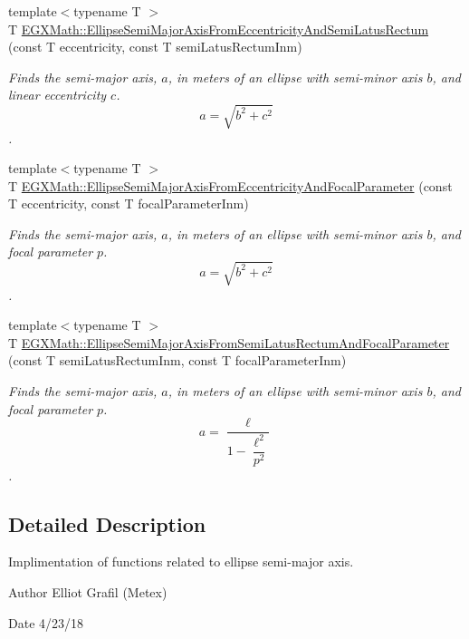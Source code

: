\begin{DoxyCompactItemize}
{\footnotesize template$<$typename T $>$ }\\T \mbox{\hyperlink{group___e_g_x_math-_geometry-2_d-_ellipse-_semi_major_axis_ga00e19efce15b74c6556cbd5650d7f699}{E\+G\+X\+Math\+::\+Ellipse\+Semi\+Major\+Axis\+From\+Eccentricity\+And\+Semi\+Latus\+Rectum}} (const T eccentricity, const T semi\+Latus\+Rectum\+Inm)
\begin{DoxyCompactList}\small\item\em Finds the semi-\/major axis, $a$, in meters of an ellipse with semi-\/minor axis $b$, and linear eccentricity $c$. \[ a=\sqrt{b^2+c^2} \]. \end{DoxyCompactList}\item 
{\footnotesize template$<$typename T $>$ }\\T \mbox{\hyperlink{group___e_g_x_math-_geometry-2_d-_ellipse-_semi_major_axis_ga77845ca288672da90567f533679e7024}{E\+G\+X\+Math\+::\+Ellipse\+Semi\+Major\+Axis\+From\+Eccentricity\+And\+Focal\+Parameter}} (const T eccentricity, const T focal\+Parameter\+Inm)
\begin{DoxyCompactList}\small\item\em Finds the semi-\/major axis, $a$, in meters of an ellipse with semi-\/minor axis $b$, and focal parameter $p$. \[ a=\sqrt{b^2+c^2} \]. \end{DoxyCompactList}\item 
{\footnotesize template$<$typename T $>$ }\\T \mbox{\hyperlink{group___e_g_x_math-_geometry-2_d-_ellipse-_semi_major_axis_gaea152a91fc8eb6532f497e9d25f0477c}{E\+G\+X\+Math\+::\+Ellipse\+Semi\+Major\+Axis\+From\+Semi\+Latus\+Rectum\+And\+Focal\+Parameter}} (const T semi\+Latus\+Rectum\+Inm, const T focal\+Parameter\+Inm)
\begin{DoxyCompactList}\small\item\em Finds the semi-\/major axis, $a$, in meters of an ellipse with semi-\/minor axis $b$, and focal parameter $p$. \[ a=\dfrac{\ell}{1-\dfrac{\ell^2}{p^2}} \]. \end{DoxyCompactList}\end{DoxyCompactItemize}


\subsection{Detailed Description}
Implimentation of functions related to ellipse semi-\/major axis. 

\begin{DoxyAuthor}{Author}
Elliot Grafil (Metex) 
\end{DoxyAuthor}
\begin{DoxyDate}{Date}
4/23/18 
\end{DoxyDate}
